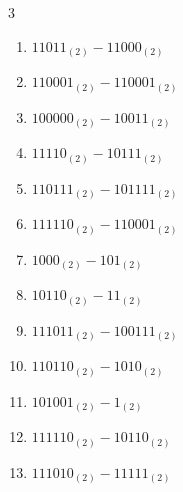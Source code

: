 \begin{multicols}{3}
\begin{enumerate}

\columnbreak %

  \item $11011_{(2)} - 11000_{(2)}$


  \item $110001_{(2)} - 110001_{(2)}$


  \item $100000_{(2)} - 10011_{(2)}$


  \item $11110_{(2)} - 10111_{(2)}$


  \item $110111_{(2)} - 101111_{(2)}$


  \item $111110_{(2)} - 110001_{(2)}$


  \item $1000_{(2)} - 101_{(2)}$


  \item $10110_{(2)} - 11_{(2)}$


  \item $111011_{(2)} - 100111_{(2)}$


  \item $110110_{(2)} - 1010_{(2)}$


\columnbreak %

  \item $101001_{(2)} - 1_{(2)}$


  \item $111110_{(2)} - 10110_{(2)}$


  \item $111010_{(2)} - 11111_{(2)}$



\end{enumerate}
\end{multicols}
